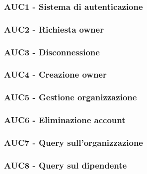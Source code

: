 \documentclass[../analisi-dei-requisiti.tex]{subfiles}
\begin{document}
\subsubsection{AUC1 - Sistema di autenticazione}%
\label{subsub:AUC1}



\subsubsection{AUC2 - Richiesta owner}%
\label{subsub:AUC2}



\subsubsection{AUC3 - Disconnessione}%
\label{subsub:AUC3}



\subsubsection{AUC4 - Creazione owner}%
\label{subsub:AUC4}



\subsubsection{AUC5 - Gestione organizzazione}%
\label{subsub:AUC5}



\subsubsection{AUC6 - Eliminazione account}%
\label{subsub:AUC6}



\subsubsection{AUC7 - Query sull'organizzazione}%
\label{subsub:AUC7}



\subsubsection{AUC8 - Query sul dipendente}%
\label{subsub:AUC8}
\end{document}
